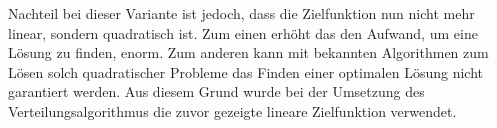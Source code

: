             Nachteil bei dieser Variante ist jedoch, dass die Zielfunktion nun nicht mehr linear, sondern quadratisch ist.
            Zum einen erhöht das den Aufwand, um eine Lösung zu finden, enorm.
            Zum anderen kann mit bekannten Algorithmen zum Lösen solch quadratischer Probleme das Finden einer optimalen Lösung nicht garantiert werden.
            Aus diesem Grund wurde bei der Umsetzung des Verteilungsalgorithmus die zuvor gezeigte lineare Zielfunktion verwendet.
            
        